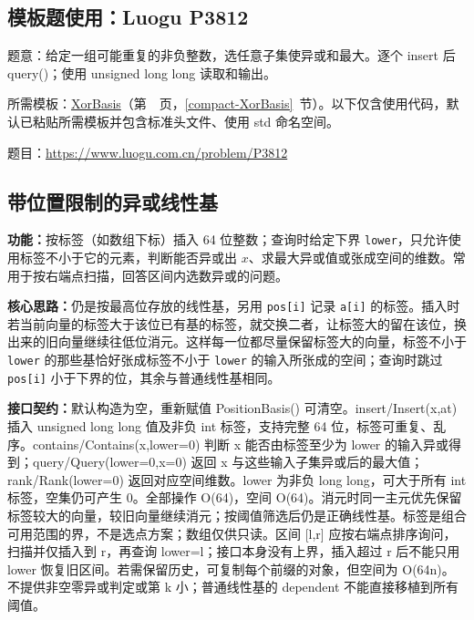 \subsection*{模板题使用：Luogu P3812}

\label{usage-example-36}

题意：给定一组可能重复的非负整数，选任意子集使异或和最大。逐个 insert 后 query()；使用 unsigned long long 读取和输出。

所需模板：\hyperref[compact-XorBasis]{XorBasis}（第~\pageref{compact-XorBasis}~页，\ref{compact-XorBasis}~节）。以下仅含使用代码，默认已粘贴所需模板并包含标准头文件、使用 std 命名空间。

题目：\url{https://www.luogu.com.cn/problem/P3812}



\subsection{带位置限制的异或线性基}\label{compact-PositionBasis}

\noindent\textbf{功能：}\allowbreak 按标签（如数组下标）插入 64 位整数；查询时给定下界 \texttt{lower}，只允许使用标签不小于它的元素，判断能否异或出 $x$、求最大异或值或张成空间的维数。常用于按右端点扫描，回答区间内选数异或的问题。

\textbf{核心思路：}\allowbreak 仍是按最高位存放的线性基，另用 \texttt{pos[i]} 记录 \texttt{a[i]} 的标签。插入时若当前向量的标签大于该位已有基的标签，就交换二者，让标签大的留在该位，换出来的旧向量继续往低位消元。这样每一位都尽量保留标签大的向量，标签不小于 \texttt{lower} 的那些基恰好张成标签不小于 \texttt{lower} 的输入所张成的空间；查询时跳过 \texttt{pos[i]} 小于下界的位，其余与普通线性基相同。



{\sloppy{}\noindent\textbf{接口契约：}默认构造为空，重新赋值 PositionBasis() 可清空。insert/Insert(x,at) 插入 unsigned long long 值及非负 int 标签，支持完整 64 位，标签可重复、乱序。contains/Contains(x,lower=0) 判断 x 能否由标签至少为 lower 的输入异或得到；query/Query(lower=0,x=0) 返回 x 与这些输入子集异或后的最大值；rank/Rank(lower=0) 返回对应空间维数。lower 为非负 long long，可大于所有 int 标签，空集仍可产生 0。全部操作 O(64)，空间 O(64)。消元时同一主元优先保留标签较大的向量，较旧向量继续消元；按阈值筛选后仍是正确线性基。标签是组合可用范围的界，不是选点方案；数组仅供只读。区间 [l,r] 应按右端点排序询问，扫描并仅插入到 r，再查询 lower=l；接口本身没有上界，插入超过 r 后不能只用 lower 恢复旧区间。若需保留历史，可复制每个前缀的对象，但空间为 O(64n)。不提供非空零异或判定或第 k 小；普通线性基的 dependent 不能直接移植到所有阈值。\par}

